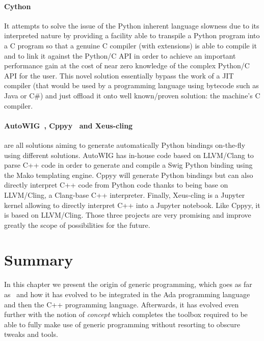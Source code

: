 \paragraph{Cython~\parencite{behnel.2010.cython}} It attempts to solve the issue of the Python inherent language
slowness due to its interpreted nature by providing a facility able to transpile a Python program into a C program so
that a genuine C compiler (with extensions) is able to compile it and to link it against the Python/C API in order to
achieve an important performance gain at the cost of near zero knowledge of the complex Python/C API for the user. This
novel solution essentially bypass the work of a JIT compiler (that would be used by a programming language using
bytecode such as Java or C\#) and just offload it onto well known/proven solution: the machine's C compiler.

\paragraph{AutoWIG~\parencite{fernique.2018.autowig}, Cppyy~\parencite{wimtlplavrijsen.2016.cppyy} and
  Xeus-cling~\parencite{quantstack.2021.xeus-cling}} are all solutions aiming to generate automatically Python bindings
on-the-fly using different solutions. AutoWIG has in-house code based on LLVM/Clang to parse C++ code in order to
generate and compile a Swig Python binding using the Mako templating engine. Cppyy will generate Python bindings but can
also directly interpret C++ code from Python code thanks to being base on LLVM/Cling, a Clang-base C++ interpreter.
Finally, Xeus-cling is a Jupyter~\parencite{kluyver.2016.jupyter} kernel allowing to directly interpret C++ into a
Jupyter notebook. Like Cppyy, it is based on LLVM/Cling. Those three projects are very promising and improve greatly the
scope of possibilities for the future.


\section{Summary}

In this chapter we present the origin of generic programming, which goes as far as~
and how it has evolved to be integrated in the Ada programming language and then the C++ programming language.
Afterwards, it has evolved even further with the notion of \emph{concept} which completes the toolbox required to be
able to fully make use of generic programming without resorting to obscure tweaks and tools.

